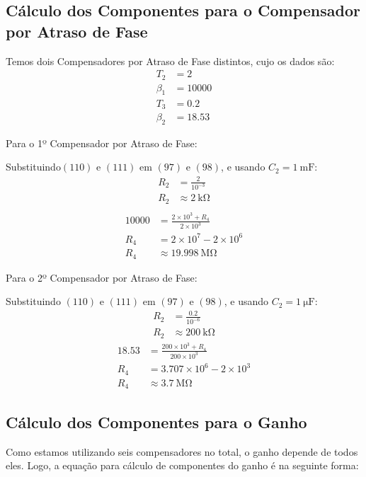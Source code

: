 \documentclass[a4paper]{article}
\begin{document}
\subsection{Cálculo dos Componentes para o Compensador por Atraso de Fase}
\par Temos dois Compensadores por Atraso de Fase distintos, cujo os dados são:
\begin{align}
	T_2 &= 2\\
	\beta_1 &= 10000\\
	T_3 &= 0.2\\
	\beta_2 &= 18.53
\end{align}
\vspace{0.5em}
\par Para o 1º Compensador por Atraso de Fase:
\par Substituindo$(110)$ e $(111)$ em $(97)$ e $(98)$, e usando $C_2  =\SI{1}{\milli \farad}$:
\begin{align}
R_2 &= \frac{2}{10^{-3}}\\
R_2 &\approx \SI{2}{\kilo\ohm}\\
\end{align}
\vspace{0.5em}
\begin{align}
10000 &= \frac{2\times10^3+R_4}{2\times10^3}\\
R_4 &= 2\times10^{7}-2\times10^6\\
R_4 &\approx \SI{19.998}{\mega\ohm}
\end{align}
\vspace{10em}
\par Para o 2º Compensador por Atraso de Fase:
\par Substituindo $(110)$ e $(111)$ em $(97)$ e $(98)$, e usando $C_2=\SI{1}{\micro\farad}$:
\begin{align}
R_2 &= \frac{0.2}{10^{-6}}\\
R_2 &\approx \SI{200}{\kilo\ohm}
\end{align}
\vspace{0.5em}
\begin{align}
18.53 &= \frac{200\times10^3+R_4}{200\times10^3}\\
R_4 &= 3.707\times10^{6}-2\times10^3\\
R_4 &\approx \SI{3.7}{\mega\ohm}
\end{align}
\subsection{Cálculo dos Componentes para o Ganho}
\par Como estamos utilizando seis compensadores no total, o ganho depende de todos eles. Logo, a equação para cálculo de componentes do ganho é na seguinte forma:
\end{document}

